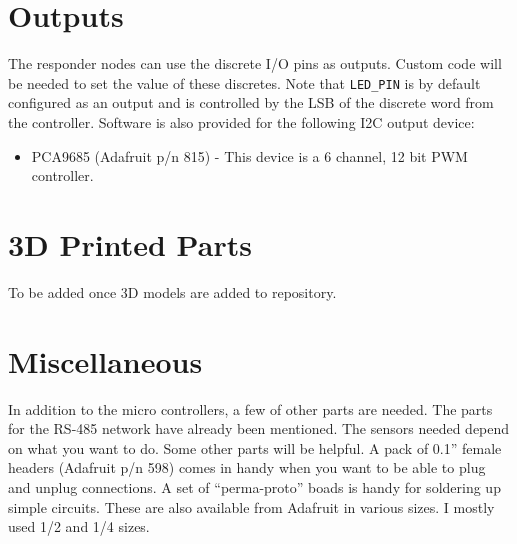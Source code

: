 \documentclass[10pt]{article}
\begin{document}
\section{Outputs}
The responder nodes can use the discrete I/O pins as outputs.  Custom code will be needed to set the value of these discretes.  Note that \texttt{LED\_PIN} is by default configured as an output and is controlled by the LSB of the discrete word from the controller.  Software is also provided for the following I2C output device:

\begin{itemize}
  \item PCA9685 (Adafruit p/n 815) - This device is a 6 channel, 12 bit PWM controller.
\end{itemize}

\section{3D Printed Parts}
To be added once 3D models are added to repository.

\section{Miscellaneous}
In addition to the micro controllers, a few of other parts are needed.  The parts for the RS-485 network have already been mentioned.  The sensors needed depend on what you want to do.  Some other parts will be helpful.  A pack of 0.1'' female headers (Adafruit p/n 598) comes in handy when you want to be able to plug and unplug connections.  A set of ``perma-proto'' boads is handy for soldering up simple circuits.  These are also available from Adafruit in various sizes.  I mostly used 1/2 and 1/4 sizes.
\end{document}
